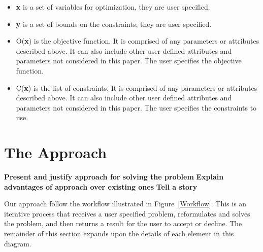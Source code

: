 \documentclass[10pt]{article}
\begin{document}
\begin{itemize}
	\item \textbf{x} is a set of variables for optimization, they are user specified.
	
	\item \textbf{y} is a set of bounds on the constraints, they are user specified.
	
	\item O(\textbf{x}) is the objective function. It is comprised of any parameters or attributes described above. It can also include other user defined attributes and parameters not considered in this paper. The user specifies the objective function.  
	
	\item C(\textbf{x}) is the list of constraints. It is comprised of any parameters or attributes described above. It can also include other user defined attributes and parameters not considered in this paper. The user specifies the constraints to use.
\end{itemize}


\section{The Approach}
\label{sec:The_Approach}

\textbf{Present and justify approach for solving the problem}
\textbf{Explain advantages of approach over existing ones}
\textbf{Tell a story}

Our approach follow the workflow illustrated in Figure~\ref{Workflow}. This is an iterative process that receives a user specified problem, reformulates and solves the problem, and then returns a result for the user to accept or decline. The remainder of this section expands upon the details of each element in this diagram.
\end{document}
